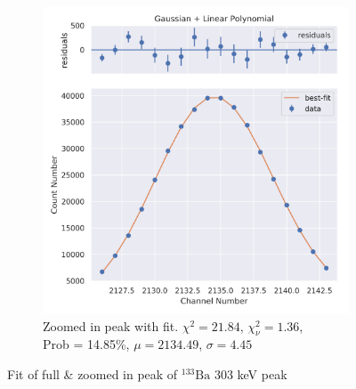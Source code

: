 \documentclass[11pt,a4paper]{article}
\newcommand{\element}[2]{$^{#2}\textrm{#1}$}
\begin{document}
\begin{figure}[H]
\begin{subfigure}{.5\linewidth}
    \includegraphics[width=\linewidth]{./Images/Barium133/Linear/Linear_5_Zoom.png}
    \caption{Zoomed in peak with fit. $\chi^2 = 21.84$, $\chi^2_\nu = 1.36$, \\ Prob = 14.85\%, $\mu = 2134.49$, $\sigma = 4.45$}
  \end{subfigure}
  \caption{Fit of full \& zoomed in peak of \element{Ba}{133} 303 keV peak}
\end{figure}
\end{document}
